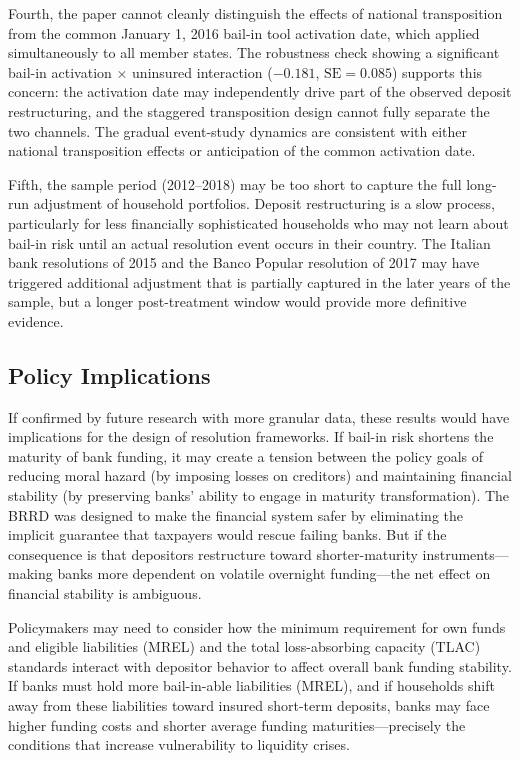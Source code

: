 \documentclass[12pt]{article}
\begin{document}
Fourth, the paper cannot cleanly distinguish the effects of national transposition from the common January 1, 2016 bail-in tool activation date, which applied simultaneously to all member states. The robustness check showing a significant bail-in activation $\times$ uninsured interaction ($-0.181$, $\text{SE} = 0.085$) supports this concern: the activation date may independently drive part of the observed deposit restructuring, and the staggered transposition design cannot fully separate the two channels. The gradual event-study dynamics are consistent with either national transposition effects or anticipation of the common activation date.

Fifth, the sample period (2012--2018) may be too short to capture the full long-run adjustment of household portfolios. Deposit restructuring is a slow process, particularly for less financially sophisticated households who may not learn about bail-in risk until an actual resolution event occurs in their country. The Italian bank resolutions of 2015 and the Banco Popular resolution of 2017 may have triggered additional adjustment that is partially captured in the later years of the sample, but a longer post-treatment window would provide more definitive evidence.

\subsection{Policy Implications}

If confirmed by future research with more granular data, these results would have implications for the design of resolution frameworks. If bail-in risk shortens the maturity of bank funding, it may create a tension between the policy goals of reducing moral hazard (by imposing losses on creditors) and maintaining financial stability (by preserving banks' ability to engage in maturity transformation). The BRRD was designed to make the financial system safer by eliminating the implicit guarantee that taxpayers would rescue failing banks. But if the consequence is that depositors restructure toward shorter-maturity instruments---making banks more dependent on volatile overnight funding---the net effect on financial stability is ambiguous.

Policymakers may need to consider how the minimum requirement for own funds and eligible liabilities (MREL) and the total loss-absorbing capacity (TLAC) standards interact with depositor behavior to affect overall bank funding stability. If banks must hold more bail-in-able liabilities (MREL), and if households shift away from these liabilities toward insured short-term deposits, banks may face higher funding costs and shorter average funding maturities---precisely the conditions that increase vulnerability to liquidity crises.
\end{document}
